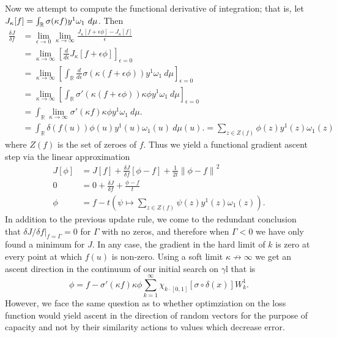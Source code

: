 \documentclass[12pt]{article}
\begin{document}
\begin{itemize}
	Now we attempt to compute the functional derivative of integration; that is, let $J_\kappa[f] = \int_{{\mathbb R}} \sigma(\kappa f) y^1 \omega_1\ d\mu$.
	Then
	\begin{equation*}
		\begin{aligned}
			\frac{\delta J}{\delta f} &= \lim_{\epsilon \to 0} \lim_{\kappa \to \infty} \frac{J_\kappa[f + \epsilon \phi] - J_\kappa[f] }{\epsilon} \\
			&= \lim_{\kappa \to \infty} \left[\frac{d}{d\epsilon} J_\kappa[f + \epsilon \phi]\right]_{\epsilon = 0} \\
			&= \lim_{\kappa \to \infty} \left[\int_{\mathbb{R}} \frac{d}{d\epsilon} \sigma(\kappa(f + \epsilon \phi))y^1\omega_1\ d\mu \right]_{\epsilon = 0} \\
			&= \lim_{\kappa \to \infty} \left[\int_{\mathbb{R}}  \sigma'(\kappa(f + \epsilon \phi)) \kappa \phi  y^1\omega_1\ d\mu \right]_{\epsilon = 0} \\
			&=  \int_{\mathbb{R}}  \lim_{\kappa \to \infty} \sigma'(\kappa f) \kappa \phi  y^1\omega_1\ d\mu. \\
			&=  \int_{\mathbb{R}} \delta(f(u)) \phi(u)  y^1(u)\omega_1(u)\ d\mu(u).
			= \sum_{z \in Z(f)} \phi(z) y^1(z) \omega_1(z)
		\end{aligned}
	\end{equation*}
	where $Z(f)$ is the set of zeroes of $f$. Thus we yield a functional gradient ascent step via the linear approximation
	\begin{equation*}
	\begin{aligned}
		J[\phi] &= J[f] + \frac{\delta J}{\delta f}[\phi -f] + \frac{1}{2t} \left\|\phi - f\right\|^2 \\
		0&= 0 +  \frac{\delta J}{\delta f} + \frac{\phi - f}{t} \\
		\phi &= f - t \left(\psi \mapsto \sum_{z \in Z(f)} \psi(z) y^1(z) \omega_1(z)\right).
	\end{aligned}
	\end{equation*}
	In addition to the previous update rule, we come to the redundant conclusion that $\delta J/\delta f|_{f=\Gamma} = 0$ for $\Gamma$ with no zeros, and therefore when $\Gamma < 0$ we have only found a minimum for $J$. In any case, the gradient in the hard limit of $k$ is zero at every point at which $f(u)$ is non-zero. Using a soft limit $\kappa \not \to \infty$ we get an ascent direction in the continuum of our initial search on $\gamma$l that is
	\begin{equation*}
		\phi = f - \sigma'(\kappa f) \kappa \phi \sum_{k=1}^\infty \chi_{k\cdot [0,1]} \left[\sigma \circ \delta(x)\right] W_k^1.
	\end{equation*}
	However, we face the same question as to whether optimziation on the loss function would yield ascent in the direction of random vectors for the purpose of capacity and not by their similarity actions to values which decrease error.


\end{itemize}
\end{document}
